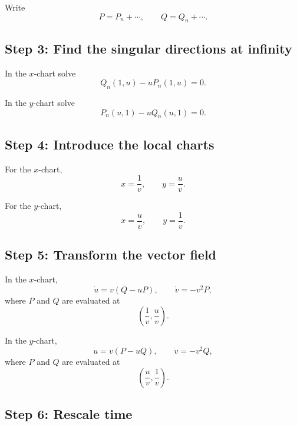 \documentclass[11pt,a4paper]{article}
\begin{document}
Write
\begin{equation}
P=P_n+\cdots,
\qquad
Q=Q_n+\cdots.
\end{equation}

\subsection*{Step 3: Find the singular directions at infinity}

In the $x$-chart solve
\begin{equation}
\boxed{
Q_n(1,u)-uP_n(1,u)=0.
}
\end{equation}

In the $y$-chart solve
\begin{equation}
\boxed{
P_n(u,1)-uQ_n(u,1)=0.
}
\end{equation}

\subsection*{Step 4: Introduce the local charts}

For the $x$-chart,
\begin{equation}
\boxed{
x=\frac1v,
\qquad
y=\frac uv.
}
\end{equation}

For the $y$-chart,
\begin{equation}
\boxed{
x=\frac uv,
\qquad
y=\frac1v.
}
\end{equation}

\subsection*{Step 5: Transform the vector field}

In the $x$-chart,
\begin{equation}
\boxed{
\dot u
=
v(Q-uP),
\qquad
\dot v=-v^2P,
}
\end{equation}
where $P$ and $Q$ are evaluated at
\begin{equation}
\left(\frac1v,\frac uv\right).
\end{equation}

In the $y$-chart,
\begin{equation}
\boxed{
\dot u
=
v(P-uQ),
\qquad
\dot v=-v^2Q,
}
\end{equation}
where $P$ and $Q$ are evaluated at
\begin{equation}
\left(\frac uv,\frac1v\right).
\end{equation}

\subsection*{Step 6: Rescale time}
\end{document}
